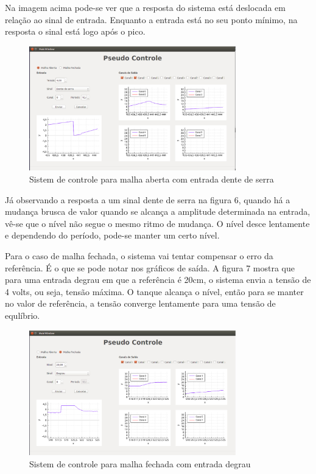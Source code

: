 \documentclass[a4paper,12pt]{article}
\begin{document}
Na imagem acima pode-se ver que a resposta do sistema está deslocada em relação ao sinal de entrada. Enquanto a entrada está no seu ponto mínimo, na resposta o sinal está logo após o pico. 

\begin{figure}[!h]
\centering
\includegraphics[width=0.8\textwidth]{maberta-serra-4.eps}
\caption{Sistem de controle para malha aberta com entrada dente de serra}
\label{Entrada Dente de Serra - aberta}
\end{figure}

\newpage
Já observando a resposta a um sinal dente de serra na figura 6, quando há a mudança brusca de valor quando se alcança a amplitude determinada na entrada, vê-se que o nível não segue o mesmo ritmo de mudança. O nível desce lentamente e dependendo do período, pode-se manter um certo nível.

Para o caso de malha fechada, o sistema vai tentar compensar o erro da referência. É o que se pode notar nos gráficos de saída. A figura 7 mostra que para uma entrada degrau em que a referência é 20cm, o sistema envia a tensão de 4 volts, ou seja, tensão máxima. O tanque alcança o nível, então para se manter no valor de referência, a tensão converge lentamente para uma tensão de equlíbrio.

\begin{figure}[!h]
\centering
\includegraphics[width=0.8\textwidth]{mfechada-degrau-20.eps}
\caption{Sistem de controle para malha fechada com entrada degrau}
\label{Entrada Degrau - fechada}
\end{figure}
\end{document}
